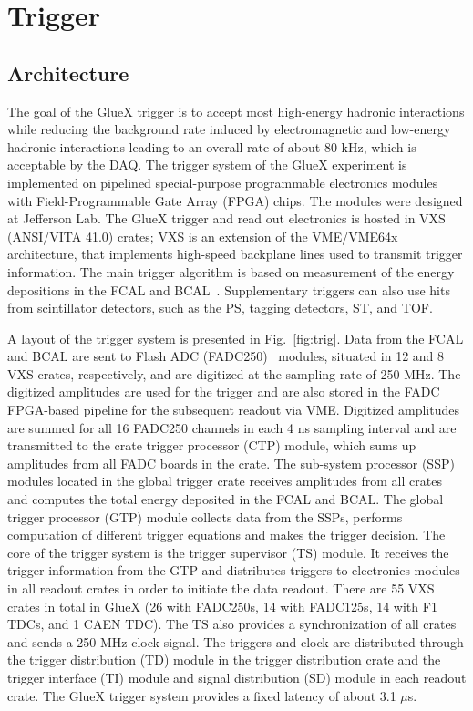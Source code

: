 
\section[Trigger]{Trigger \label{sec:trig}}
\subsection{Architecture \label{sec:trigarchitecture}}
The goal of the GlueX trigger is to accept most high-energy hadronic interactions while reducing the background rate induced by electromagnetic and low-energy hadronic interactions leading to an overall rate of about 80 kHz, which is acceptable by the DAQ.  The trigger system of the GlueX experiment\cite{GlueX:2013twa} is implemented on pipelined special-purpose programmable electronics modules with Field-Programmable Gate Array (FPGA) chips. The modules were designed at Jefferson Lab.  The GlueX trigger and read out electronics is hosted in VXS (ANSI/VITA 41.0) crates; VXS is an extension of the VME/VME64x architecture, that implements high-speed backplane lines used to transmit trigger information. The main trigger algorithm is 
based on measurement of the energy depositions in the FCAL and BCAL~\cite{somov_l1}. Supplementary triggers can also
use hits from scintillator detectors, such as the PS, tagging detectors, ST, and TOF.

A layout of the trigger system is presented in Fig.~\ref{fig:trig}. Data from the FCAL and BCAL are sent to  Flash ADC (FADC250)~\cite{Dong:2007} modules, situated in 12 and 8 VXS crates, respectively, and are digitized at the sampling rate of 250 MHz. The digitized amplitudes are used for the trigger and are also stored in the FADC FPGA-based pipeline for the subsequent readout via VME.
Digitized amplitudes are summed for all 16 FADC250 channels in each 4 ns sampling interval and are transmitted to the crate trigger processor (CTP) module, which sums up amplitudes from all FADC boards in the crate. The sub-system processor (SSP) modules located in the global trigger crate receives amplitudes from all crates and computes the total energy deposited in the FCAL and BCAL. The global trigger processor (GTP) module collects data from the SSPs, performs computation of different trigger equations and makes the trigger decision. The core of the trigger system is the trigger supervisor (TS) module. It receives the trigger information from the GTP and distributes triggers to electronics modules in all readout 
crates in order to initiate the data readout. There are 55 VXS crates in total in GlueX (26 with FADC250s, 14 with  FADC125s, 14 with F1 TDCs, and 1 CAEN TDC). The TS also provides a synchronization of all crates and sends a 250 MHz clock signal. The triggers and clock are distributed through the trigger distribution (TD) module in the trigger distribution crate and the trigger interface (TI) module and signal distribution (SD) module in each readout crate. The GlueX trigger system provides a fixed latency of about 3.1 $\mu$s.


